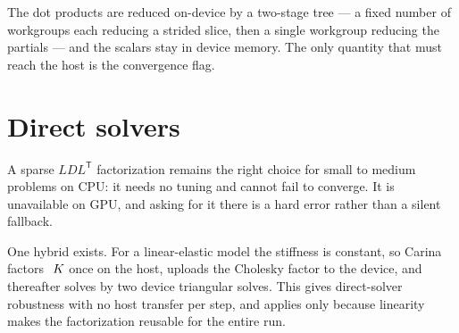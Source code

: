 The dot products are reduced on-device by a two-stage tree --- a fixed number
of workgroups each reducing a strided slice, then a single workgroup reducing
the partials --- and the scalars stay in device memory.  The only quantity that
must reach the host is the convergence flag.

\section{Direct solvers}
\label{sec:gpu-cholesky}

A sparse $LDL^{\mathsf{T}}$ factorization remains the right choice for small to
medium problems on CPU: it needs no tuning and cannot fail to converge.  It is
unavailable on GPU, and asking for it there is a hard error rather than a
silent fallback.

One hybrid exists.  For a linear-elastic model the stiffness is constant, so
Carina factors $~K$ once on the host, uploads the Cholesky factor to the
device, and thereafter solves by two device triangular solves.  This gives
direct-solver robustness with no host transfer per step, and applies only
because linearity makes the factorization reusable for the entire run.
